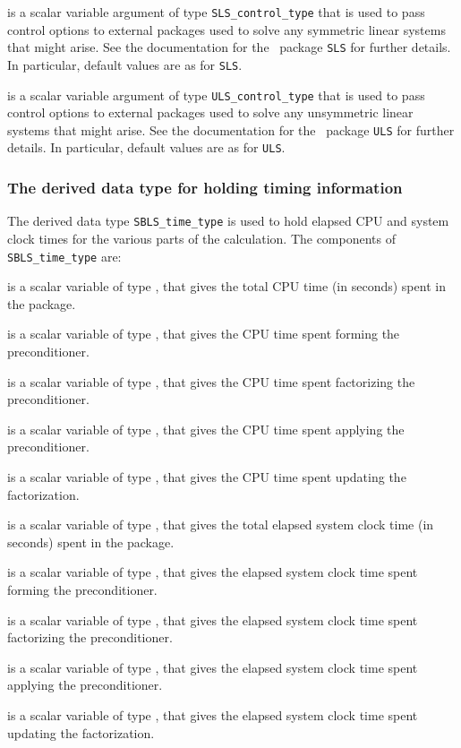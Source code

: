 \documentclass{galahad}
\newcommand{\packagename}{SBLS}
\begin{document}
\begin{description}
 is a scalar variable argument of type
{\tt SLS\_control\_type} that is used to pass control
options to external packages used to solve any symmetric
linear systems that might arise.
See the documentation for the \galahad\ package {\tt SLS} for further details.
In particular, default values are as for {\tt SLS}.

 is a scalar variable argument of type
{\tt ULS\_control\_type} that is used to pass control
options to external packages used to solve any unsymmetric
linear systems that might arise.
See the documentation for the \galahad\ package {\tt ULS} for further details.
In particular, default values are as for {\tt ULS}.

\end{description}


\subsubsection{The derived data type for holding timing
 information}\label{typetime}
The derived data type
{\tt \packagename\_time\_type}
is used to hold elapsed CPU and system clock times for the various parts
of the calculation. The components of
{\tt \packagename\_time\_type}
are:
\begin{description}
 is a scalar variable of type \realdp, that gives
 the total CPU time (in seconds) spent in the package.

 is a scalar variable of type \realdp, that gives
 the CPU time spent forming the preconditioner.

 is a scalar variable of type \realdp, that gives
 the CPU time spent factorizing the preconditioner.

 is a scalar variable of type \realdp, that gives
 the CPU time spent applying the preconditioner.

 is a scalar variable of type \realdp, that gives
 the CPU time spent updating the factorization.

 is a scalar variable of type \realdp, that gives
 the total elapsed system clock time (in seconds) spent in the package.

 is a scalar variable of type \realdp, that gives
 the  elapsed system clock time spent forming the preconditioner.

 is a scalar variable of type \realdp, that gives
 the elapsed system clock time spent factorizing the preconditioner.

 is a scalar variable of type \realdp, that gives
 the elapsed system clock time spent applying the preconditioner.

 is a scalar variable of type \realdp, that gives
 the elapsed system clock time spent updating the factorization.

\end{description}
\end{document}
